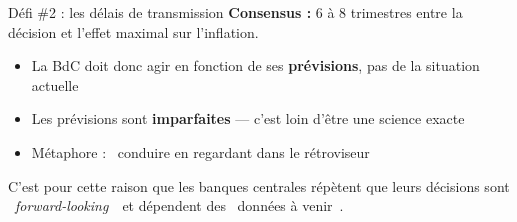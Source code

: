\documentclass[aspectratio=169]{beamer}
\begin{document}
\begin{frame}[t]{Défi \#2 : les délais de transmission}\examtag
   \small
   \vspace{0.2cm}
   \textbf{Consensus :} 6 à 8 trimestres entre la décision et l'effet maximal sur l'inflation.
   \vspace{0.2cm}
   \begin{itemize}
      \setlength\itemsep{0.2cm}
      \item La BdC doit donc agir en fonction de ses \textbf{prévisions}, pas de la situation actuelle
      \item Les prévisions sont \textbf{imparfaites} --- c'est loin d'être une science exacte
      \item Métaphore : \guillemotleft~conduire en regardant dans le rétroviseur~\guillemotright
   \end{itemize}
   \vspace{0.2cm}
   \begin{keyinsight}
      C'est pour cette raison que les banques centrales répètent que leurs décisions sont \guillemotleft~\textit{forward-looking}~\guillemotright\ et dépendent des \guillemotleft~données à venir~\guillemotright.
   \end{keyinsight}
\end{frame}
\end{document}
